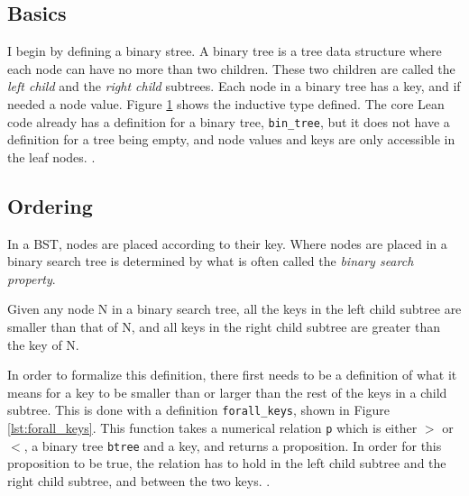 \subsection*{Basics}
I begin by defining a binary stree. A binary tree is a tree data structure where each node can have no more than two children. These two children are 
called the \textit{left child} and the \textit{right child} subtrees. Each node in a binary tree has a key, and if needed a node value. 
Figure \ref{lst:btree} shows the inductive type defined. The core Lean code already has a definition for a binary tree, \lstinline{bin_tree}, but it does not 
have a definition for a tree being empty, and node values and keys are only accessible in the leaf nodes. .

\begin{figure}[!ht]
  \centering
  
  \caption{}
  \label{lst:btree}
\end{figure}

\subsection*{Ordering}
In a BST, nodes are placed according to their key. Where nodes are placed in a binary search tree is determined by what is often called the \textit{binary search property}.

\begin{definition}
  \label{def:bst_property}
  Given any node N in a binary search tree, all the keys in the left child subtree are smaller than that of N, and all keys in the right child subtree are greater than the 
  key of N.
\end{definition}

In order to formalize this definition, there first needs to be a definition of what it means for a key to be smaller than or larger than the rest of the keys in a child subtree. This is done with a definition \lstinline{forall_keys}, shown in Figure \ref{lst:forall_keys}.
This function takes a numerical relation \lstinline{p} which is either $>$ or $<$, a binary tree \lstinline{btree} and a key, and returns a proposition. In order for this proposition to be true, the relation has to hold in the left child subtree and the right child subtree, and between the two
keys. .

